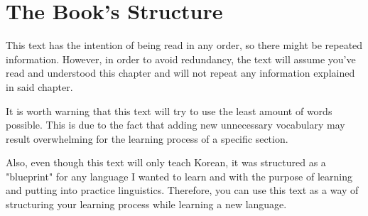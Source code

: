 \section{The Book's Structure}

This text has the intention of being read in any order, so there might be repeated information. However, in order to avoid redundancy, the text will assume you've read and understood this chapter and will not repeat any information explained in said chapter.

It is worth warning that this text will try to use the least amount of words possible. This is due to the fact that adding new unnecessary vocabulary may result overwhelming for the learning process of a specific section. 

Also, even though this text will only teach Korean, it was structured as a "blueprint" for any language I wanted to learn and with the purpose of learning and putting into practice linguistics. Therefore, you can use this text as a way of structuring your learning process while learning a new language.
